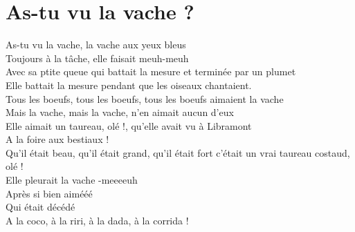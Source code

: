 \section*{As-tu vu la vache ?}
As-tu vu la vache, la vache aux yeux bleus\\
Toujours à la tâche, elle faisait meuh-meuh\\
Avec sa ptite queue qui battait la mesure et terminée par un plumet\\
Elle battait la mesure pendant que les oiseaux chantaient.\\
Tous les boeufs, tous les boeufs, tous les boeufs aimaient la vache\\
Mais la vache, mais la vache, n’en aimait aucun d’eux\\
Elle aimait un taureau, olé !, qu’elle avait vu à Libramont\\
A la foire aux bestiaux !\\
Qu’il était beau, qu’il était grand, qu’il était fort c’était un vrai taureau costaud, olé !\\
Elle pleurait la vache -meeeeuh\\
Après si bien aimééé\\
Qui était décédé\\
A la coco, à la riri, à la dada, à la corrida !\\
